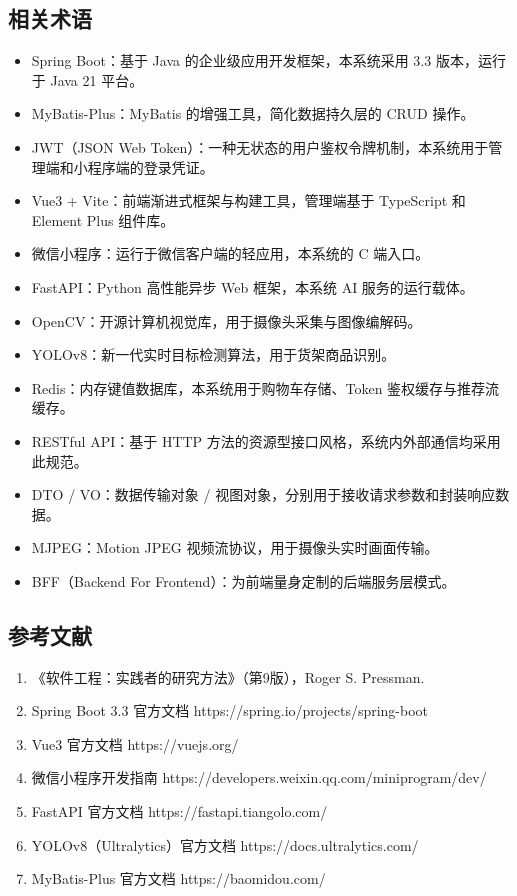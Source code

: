 \subsection{相关术语}
\begin{itemize}[leftmargin=2em]
  \item Spring Boot：基于 Java 的企业级应用开发框架，本系统采用 3.3 版本，运行于 Java 21 平台。
  \item MyBatis-Plus：MyBatis 的增强工具，简化数据持久层的 CRUD 操作。
  \item JWT（JSON Web Token）：一种无状态的用户鉴权令牌机制，本系统用于管理端和小程序端的登录凭证。
  \item Vue3 + Vite：前端渐进式框架与构建工具，管理端基于 TypeScript 和 Element Plus 组件库。
  \item 微信小程序：运行于微信客户端的轻应用，本系统的 C 端入口。
  \item FastAPI：Python 高性能异步 Web 框架，本系统 AI 服务的运行载体。
  \item OpenCV：开源计算机视觉库，用于摄像头采集与图像编解码。
  \item YOLOv8：新一代实时目标检测算法，用于货架商品识别。
  \item Redis：内存键值数据库，本系统用于购物车存储、Token 鉴权缓存与推荐流缓存。
  \item RESTful API：基于 HTTP 方法的资源型接口风格，系统内外部通信均采用此规范。
  \item DTO / VO：数据传输对象 / 视图对象，分别用于接收请求参数和封装响应数据。
  \item MJPEG：Motion JPEG 视频流协议，用于摄像头实时画面传输。
  \item BFF（Backend For Frontend）：为前端量身定制的后端服务层模式。
\end{itemize}

\subsection{参考文献}
\begin{enumerate}[leftmargin=2em]
  \item 《软件工程：实践者的研究方法》（第9版），Roger S. Pressman.
  \item Spring Boot 3.3 官方文档 \textnormal{https://spring.io/projects/spring-boot}
  \item Vue3 官方文档 \textnormal{https://vuejs.org/}
  \item 微信小程序开发指南 \textnormal{https://developers.weixin.qq.com/miniprogram/dev/}
  \item FastAPI 官方文档 \textnormal{https://fastapi.tiangolo.com/}
  \item YOLOv8（Ultralytics）官方文档 \textnormal{https://docs.ultralytics.com/}
  \item MyBatis-Plus 官方文档 \textnormal{https://baomidou.com/}
\end{enumerate}

